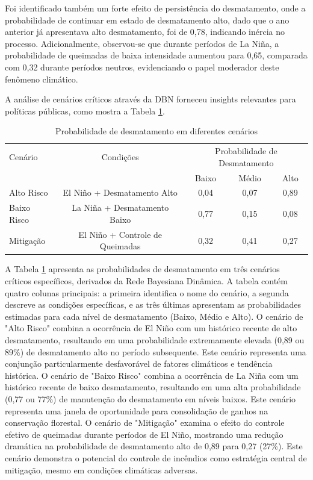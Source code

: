 \documentclass[12pt,a4paper]{article}
\begin{document}
Foi identificado também um forte efeito de persistência do desmatamento, onde a probabilidade de continuar em estado de desmatamento alto, dado que o ano anterior já apresentava alto desmatamento, foi de 0,78, indicando inércia no processo. Adicionalmente, observou-se que durante períodos de La Niña, a probabilidade de queimadas de baixa intensidade aumentou para 0,65, comparada com 0,32 durante períodos neutros, evidenciando o papel moderador deste fenômeno climático.

A análise de cenários críticos através da DBN forneceu insights relevantes para políticas públicas, como mostra a Tabela \ref{tab:cenarios}.

\begin{table}[htbp]
\centering
\caption{Probabilidade de desmatamento em diferentes cenários}
\label{tab:cenarios}
\begin{tabular}{lcccc}
\toprule
Cenário & Condições & \multicolumn{3}{c}{Probabilidade de Desmatamento} \\
\cmidrule(lr){3-5}
        &           & Baixo & Médio & Alto \\
\midrule
Alto Risco & El Niño + Desmatamento Alto & 0,04 & 0,07 & 0,89 \\
Baixo Risco & La Niña + Desmatamento Baixo & 0,77 & 0,15 & 0,08 \\
Mitigação & El Niño + Controle de Queimadas & 0,32 & 0,41 & 0,27 \\
\bottomrule
\end{tabular}
\end{table}

A Tabela \ref{tab:cenarios} apresenta as probabilidades de desmatamento em três cenários críticos específicos, derivados da Rede Bayesiana Dinâmica. A tabela contém quatro colunas principais: a primeira identifica o nome do cenário, a segunda descreve as condições específicas, e as três últimas apresentam as probabilidades estimadas para cada nível de desmatamento (Baixo, Médio e Alto). O cenário de "Alto Risco" combina a ocorrência de El Niño com um histórico recente de alto desmatamento, resultando em uma probabilidade extremamente elevada (0,89 ou 89\%) de desmatamento alto no período subsequente. Este cenário representa uma conjunção particularmente desfavorável de fatores climáticos e tendência histórica. O cenário de "Baixo Risco" combina a ocorrência de La Niña com um histórico recente de baixo desmatamento, resultando em uma alta probabilidade (0,77 ou 77\%) de manutenção do desmatamento em níveis baixos. Este cenário representa uma janela de oportunidade para consolidação de ganhos na conservação florestal. O cenário de "Mitigação" examina o efeito do controle efetivo de queimadas durante períodos de El Niño, mostrando uma redução dramática na probabilidade de desmatamento alto de 0,89 para 0,27 (27\%). Este cenário demonstra o potencial do controle de incêndios como estratégia central de mitigação, mesmo em condições climáticas adversas.
\end{document}
